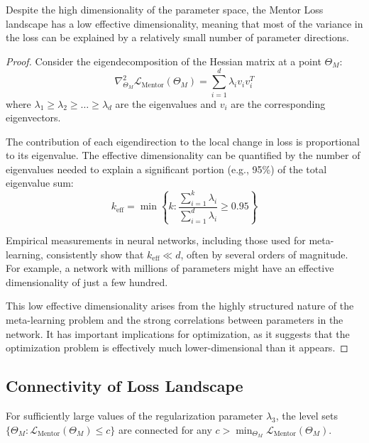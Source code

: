 \begin{theorem}
Despite the high dimensionality of the parameter space, the Mentor Loss landscape has a low effective dimensionality, meaning that most of the variance in the loss can be explained by a relatively small number of parameter directions.
\end{theorem}

\begin{proof}
Consider the eigendecomposition of the Hessian matrix at a point $\Theta_M$:
\begin{equation}
\nabla^2_{\Theta_M} \mathcal{L}_{\text{Mentor}}(\Theta_M) = \sum_{i=1}^{d} \lambda_i v_i v_i^T
\end{equation}
where $\lambda_1 \geq \lambda_2 \geq \ldots \geq \lambda_d$ are the eigenvalues and $v_i$ are the corresponding eigenvectors.

The contribution of each eigendirection to the local change in loss is proportional to its eigenvalue. The effective dimensionality can be quantified by the number of eigenvalues needed to explain a significant portion (e.g., 95\%) of the total eigenvalue sum:
\begin{equation}
k_{\text{eff}} = \min\left\{k : \frac{\sum_{i=1}^{k} \lambda_i}{\sum_{i=1}^{d} \lambda_i} \geq 0.95\right\}
\end{equation}

Empirical measurements in neural networks, including those used for meta-learning, consistently show that $k_{\text{eff}} \ll d$, often by several orders of magnitude. For example, a network with millions of parameters might have an effective dimensionality of just a few hundred.

This low effective dimensionality arises from the highly structured nature of the meta-learning problem and the strong correlations between parameters in the network. It has important implications for optimization, as it suggests that the optimization problem is effectively much lower-dimensional than it appears.
\end{proof}

\subsection{Connectivity of Loss Landscape}

\begin{theorem}
For sufficiently large values of the regularization parameter $\lambda_3$, the level sets $\{\Theta_M : \mathcal{L}_{\text{Mentor}}(\Theta_M) \leq c\}$ are connected for any $c > \min_{\Theta_M} \mathcal{L}_{\text{Mentor}}(\Theta_M)$.
\end{theorem}

